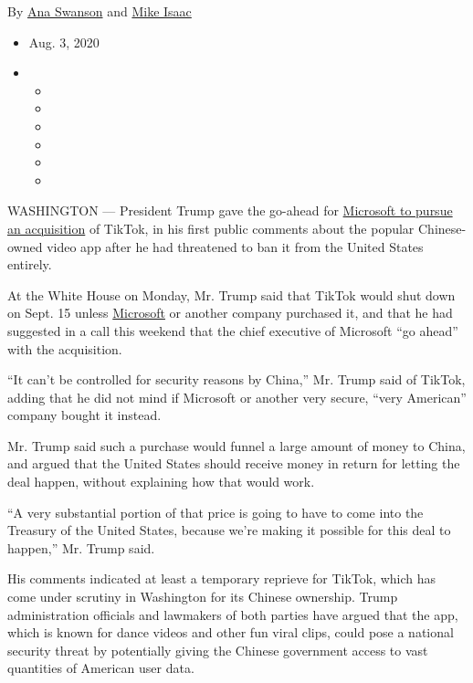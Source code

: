 By \href{https://www.nytimes3xbfgragh.onion/by/ana-swanson}{Ana Swanson}
and \href{https://www.nytimes3xbfgragh.onion/by/mike-isaac}{Mike Isaac}

\begin{itemize}
\item
  Aug. 3, 2020
\item
  \begin{itemize}
  \item
  \item
  \item
  \item
  \item
  \item
  \end{itemize}
\end{itemize}

WASHINGTON --- President Trump gave the go-ahead for
\href{https://www.nytimes3xbfgragh.onion/2020/08/02/business/economy/trump-tiktok-china-national-security.html}{Microsoft
to pursue an acquisition} of TikTok, in his first public comments about
the popular Chinese-owned video app after he had threatened to ban it
from the United States entirely.

At the White House on Monday, Mr. Trump said that TikTok would shut down
on Sept. 15 unless
\href{https://www.nytimes3xbfgragh.onion/2020/08/03/us/navy-seal-museum-kaepernick.html}{Microsoft}
or another company purchased it, and that he had suggested in a call
this weekend that the chief executive of Microsoft ``go ahead'' with the
acquisition.

``It can't be controlled for security reasons by China,'' Mr. Trump said
of TikTok, adding that he did not mind if Microsoft or another very
secure, ``very American'' company bought it instead.

Mr. Trump said such a purchase would funnel a large amount of money to
China, and argued that the United States should receive money in return
for letting the deal happen, without explaining how that would work.

``A very substantial portion of that price is going to have to come into
the Treasury of the United States, because we're making it possible for
this deal to happen,'' Mr. Trump said.

His comments indicated at least a temporary reprieve for TikTok, which
has come under scrutiny in Washington for its Chinese ownership. Trump
administration officials and lawmakers of both parties have argued that
the app, which is known for dance videos and other fun viral clips,
could pose a national security threat by potentially giving the Chinese
government access to vast quantities of American user data.

